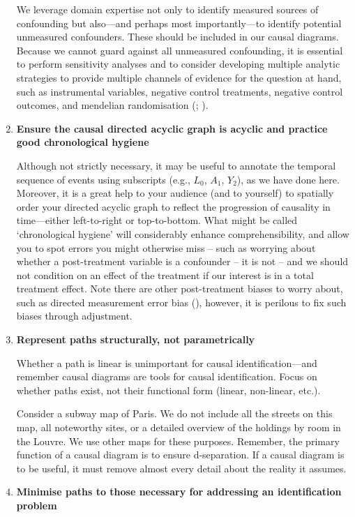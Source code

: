 \documentclass[
  single column]{article}
\begin{document}
\begin{enumerate}
  We leverage domain expertise not only to identify measured sources of
  confounding but also---and perhaps most importantly---to identify
  potential unmeasured confounders. These should be included in our
  causal diagrams. Because we cannot guard against all unmeasured
  confounding, it is essential to perform sensitivity analyses and to
  consider developing multiple analytic strategies to provide multiple
  channels of evidence for the question at hand, such as instrumental
  variables, negative control treatments, negative control outcomes, and
  mendelian randomisation (; ).
\item
  \textbf{Ensure the causal directed acyclic graph is acyclic and
  practice good chronological hygiene}

  Although not strictly necessary, it may be useful to annotate the
  temporal sequence of events using subscripts (e.g., \(L_0\), \(A_1\),
  \(Y_2\)), as we have done here. Moreover, it is a great help to your
  audience (and to yourself) to spatially order your directed acyclic
  graph to reflect the progression of causality in time---either
  left-to-right or top-to-bottom. What might be called `chronological
  hygiene' will considerably enhance comprehensibility, and allow you to
  spot errors you might otherwise miss -- such as worrying about whether
  a post-treatment variable is a confounder -- it is not -- and we
  should not condition on an effect of the treatment if our interest is
  in a total treatment effect. Note there are other post-treatment
  biases to worry about, such as directed measurement error bias
  (), however, it is
  perilous to fix such biases through adjustment.
\item
  \textbf{Represent paths structurally, not parametrically}

  Whether a path is linear is unimportant for causal
  identification---and remember causal diagrams are tools for causal
  identification. Focus on whether paths exist, not their functional
  form (linear, non-linear, etc.).

  Consider a subway map of Paris. We do not include all the streets on
  this map, all noteworthy sites, or a detailed overview of the holdings
  by room in the Louvre. We use other maps for these purposes. Remember,
  the primary function of a causal diagram is to ensure d-separation. If
  a causal diagram is to be useful, it must remove almost every detail
  about the reality it assumes.
\item
  \textbf{Minimise paths to those necessary for addressing an
  identification problem}


\end{enumerate}
\end{document}
